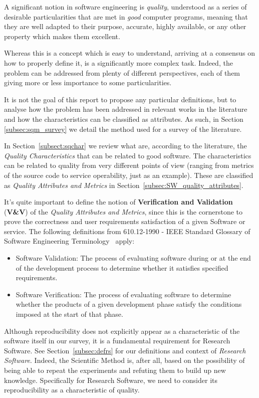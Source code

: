A significant notion in software engineering is \textit{quality}, understood as a series of desirable particularities that are met in \textit{good} computer programs, meaning that they are well adapted to their purpose, accurate, highly available, or any other property which makes them excellent.

Whereas this is a concept which is easy to understand, arriving at a consensus on how to properly define it, is a significantly more complex task. Indeed, the problem can be addressed from plenty of different perspectives, each of them giving more or less importance to some particularities.

It is not the goal of this report to propose any particular definitions, but to analyse how the problem has been addressed in relevant works in the literature and how the characteristics can be classified as attributes. As such, in Section \ref{subsec:sqm_survey} we detail the method used for a survey of the literature.

In Section~\ref{subsect:sqchar} we review what are, according to the literature, the \textit{Quality Characteristics} that can be related to good software. The characteristics can be related to quality from very different points of view (ranging from metrics of the source code to service operability, just as an example). These are classified as \textit{Quality Attributes and Metrics} in Section~\ref{subsec:SW_quality_attributes}.

It's quite important to define the notion of \textbf{Verification and Validation} (\textbf{V\&V}) of the \textit{Quality Attributes and Metrics}, since this is the cornerstone to prove the correctness and user requirements satisfaction of a given Software or service. The following definitions from 610.12-1990 - IEEE Standard Glossary of Software Engineering Terminology~\cite{ieee610} apply:

\begin{itemize}
    \item Software Validation: The process of evaluating software during or at the end of the development process to determine whether it satisfies specified requirements.
    \item Software Verification: The process of evaluating software to determine whether the products of a given development phase satisfy the conditions imposed at the start of that phase.
\end{itemize}

Although reproducibility does not explicitly appear as a characteristic of the software itself in our survey, it is a fundamental requirement for Research Software. See Section~\ref{subsec:defrs} for our definitions and context of \textit{Research Software}. Indeed, the Scientific Method is, after all, based on the possibility of being able to repeat the experiments and refuting them to build up new knowledge. Specifically for Research Software, we need to consider its reproducibility as a characteristic of quality.

